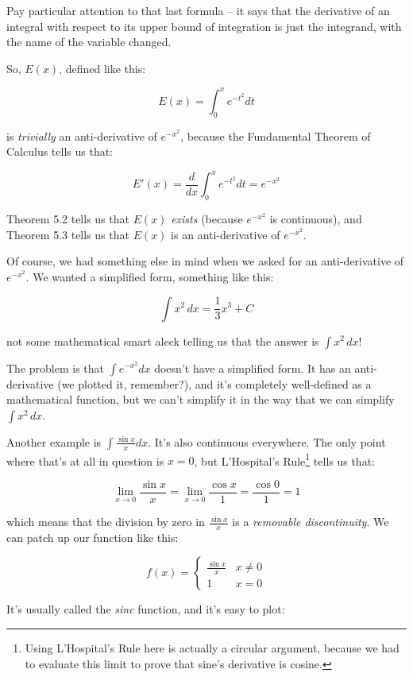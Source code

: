 Pay particular attention to that last formula -- it says that the derivative of an integral with respect
to its upper bound of integration is just the integrand, with the name of the variable changed.

So, $E(x)$, defined like this:

$$E(x) = \int_0^x e^{-t^2} dt$$

is {\it trivially} an anti-derivative of $e^{-x^2}$, because the Fundamental Theorem of Calculus tells us that:

$$E'(x) = \frac{d}{dx} \int_0^x e^{-t^2} dt = e^{-x^2}$$

\cite{briggs} Theorem 5.2 tells us that $E(x)$ {\it exists} (because $e^{-x^2}$ is continuous), and \cite{briggs} Theorem 5.3 tells
us that $E(x)$ is an anti-derivative of $e^{-x^2}$.

Of course, we had something else in mind when we asked for an anti-derivative of $e^{-x^2}$.  We wanted
a simplified form, something like this:

$$\int x^2\,dx = \frac{1}{3} x^3 + C$$

not some mathematical smart aleck telling us that the answer is $\int x^2\,dx$!

The problem is that $\int e^{-x^2} dx$ doesn't have a simplified form.  It has an anti-derivative
(we plotted it, remember?), and it's completely well-defined as a mathematical function, but we
can't simplify it in the way that we can simplify $\int x^2\,dx$.

Another example is $\int \frac{\sin x}{x} dx$.  It's also continuous everywhere.  The only point
where that's at all in question is $x=0$, but L'Hospital's Rule\footnote{Using L'Hospital's Rule here is actually
a circular argument, because we had to evaluate this limit to prove that sine's derivative is cosine.} tells us that:

$$\lim_{x\to 0} \frac{\sin x}{x} = \lim_{x\to 0} \frac{\cos x}{1} = \frac{\cos 0}{1} = 1$$

which means that the division by zero in $\frac{\sin x}{x}$ is a {\it removable discontinuity}.
We can patch up our function like this:

\[ f(x) = \begin{cases} 
      \frac{\sin x}{x} & x \ne 0 \\
      1 & x = 0
   \end{cases}
\]

It's usually called the {\it sinc} function, and it's easy to plot:


